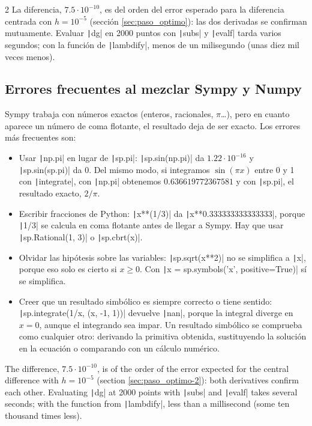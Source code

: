\begin{paracol}{2}
La diferencia, $7.5\cdot10^{-10}$, es del orden del error esperado para la diferencia centrada con $h=10^{-5}$ (sección \ref{sec:paso_optimo}): las dos derivadas se confirman mutuamente. Evaluar \texttt|dg| en 2000 puntos con \texttt|subs| y \texttt|evalf| tarda varios segundos; con la función de \texttt|lambdify|, menos de un milisegundo (unas diez mil veces menos).

\subsection{Errores frecuentes al mezclar Sympy y Numpy}
Sympy trabaja con números exactos (enteros, racionales, $\pi$\ldots), pero en cuanto aparece un número de coma flotante, el resultado deja de ser exacto. Los errores más frecuentes son:
\begin{itemize}
\item Usar \texttt|np.pi| en lugar de \texttt|sp.pi|: \texttt|sp.sin(np.pi)| da $1.22\cdot10^{-16}$ y \texttt|sp.sin(sp.pi)| da $0$. Del mismo modo, si integramos $\sin(\pi x)$ entre 0 y 1 con \texttt|integrate|, con \texttt|np.pi| obtenemos $0.636619772367581$ y con \texttt|sp.pi|, el resultado exacto, $2/\pi$.
\item Escribir fracciones de Python: \texttt|x**(1/3)| da \texttt|x**0.333333333333333|, porque \texttt|1/3| se calcula en coma flotante antes de llegar a Sympy. Hay que usar \texttt|sp.Rational(1, 3)| o \texttt|sp.cbrt(x)|.
\item Olvidar las hipótesis sobre las variables: \texttt|sp.sqrt(x**2)| no se simplifica a \texttt|x|, porque eso solo es cierto si $x\geq0$. Con \texttt|x = sp.symbols('x', positive=True)| sí se simplifica.
\item Creer que un resultado simbólico es siempre correcto o tiene sentido: \texttt|sp.integrate(1/x, (x, -1, 1))| devuelve \texttt|nan|, porque la integral diverge en $x=0$, aunque el integrando sea impar. Un resultado simbólico se comprueba como cualquier otro: derivando la primitiva obtenida, sustituyendo la solución en la ecuación o comparando con un cálculo numérico.
\end{itemize}
\switchcolumn
The difference, $7.5\cdot10^{-10}$, is of the order of the error expected for the central difference with $h=10^{-5}$ (section \ref{sec:paso_optimo-2}): both derivatives confirm each other. Evaluating \texttt|dg| at 2000 points with \texttt|subs| and \texttt|evalf| takes several seconds; with the function from \texttt|lambdify|, less than a millisecond (some ten thousand times less).


\end{paracol}
